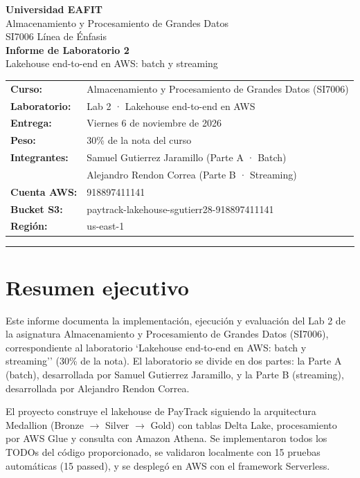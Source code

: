 ﻿\documentclass[11pt,a4paper]{article}
\begin{document}
\begin{center}
{\Large \textbf{Universidad EAFIT}}\\[0.2em]
{\normalsize Almacenamiento y Procesamiento de Grandes Datos}\\[0.2em]
{\small SI7006 \textbullet{} Línea de Énfasis}\\[1em]
{\large \textbf{Informe de Laboratorio 2}}\\[0.4em]
{\normalsize Lakehouse end-to-end en AWS: batch y streaming}\\[1em]
\end{center}

\begin{tabular}{p{} p{}}
\textbf{Curso:} & Almacenamiento y Procesamiento de Grandes Datos (SI7006) \\
\textbf{Laboratorio:} & Lab 2 · Lakehouse end-to-end en AWS \\
\textbf{Entrega:} & Viernes 6 de noviembre de 2026 \\
\textbf{Peso:} & 30\% de la nota del curso \\
\textbf{Integrantes:} & Samuel Gutierrez Jaramillo (Parte A · Batch) \\
& Alejandro Rendon Correa (Parte B · Streaming) \\
\textbf{Cuenta AWS:} & 918897411141 \\
\textbf{Bucket S3:} & paytrack-lakehouse-sgutierr28-918897411141 \\
\textbf{Región:} & us-east-1 \\
\end{tabular}

\vspace{0.8em}
\hrule
\vspace{0.8em}

\section*{Resumen ejecutivo}

Este informe documenta la implementación, ejecución y evaluación del Lab 2 de la asignatura Almacenamiento y Procesamiento de Grandes Datos (SI7006), correspondiente al laboratorio `Lakehouse end-to-end en AWS: batch y streaming'' (30\% de la nota). El laboratorio se divide en dos partes: la Parte A (batch), desarrollada por Samuel Gutierrez Jaramillo, y la Parte B (streaming), desarrollada por Alejandro Rendon Correa.

El proyecto construye el lakehouse de PayTrack siguiendo la arquitectura Medallion (Bronze $\rightarrow$ Silver $\rightarrow$ Gold) con tablas Delta Lake, procesamiento por AWS Glue y consulta con Amazon Athena. Se implementaron todos los TODOs del código proporcionado, se validaron localmente con 15 pruebas automáticas (15 passed), y se desplegó en AWS con el framework Serverless.
\end{document}
